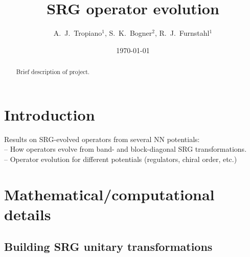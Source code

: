 \documentclass[preprintnumbers,floatfix,aps,prc,preprint,nofootinbib]{revtex4-1}
\begin{document}
\title{SRG operator evolution}


\author{A.~J.~Tropiano$^{1}$, S.~K.~Bogner$^{2}$, R.~J.~Furnstahl$^{1}$}


\date{\today}

\begin{abstract}

Brief description of project.

\end{abstract}


\maketitle

\tableofcontents

\newpage


\section{Introduction}
\label{sec:intro}


Results on SRG-evolved operators from several NN potentials:
\\
-- How operators evolve from band- and block-diagonal SRG transformations.
\\
-- Operator evolution for different potentials (regulators, chiral order, etc.)


\section{Mathematical/computational details}
\label{sec:math_comp_details}


\subsection{Building SRG unitary transformations}
\label{sec:srg_unitary_transformations}
\end{document}
